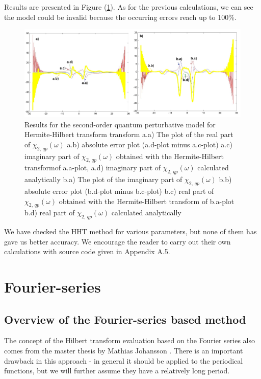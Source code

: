 \documentclass[12pt,twoside,a4paper]{article}
\numberwithin{equation}{subsection}
\numberwithin{figure}{subsection}
\begin{document}
Results are presented in Figure (\ref{fig:hht_qp2}). As for the previous calculations, we can see the model could be invalid
because the occurring errors reach up to 100\%.

\begin{figure} 
  \includegraphics[width=150mm]{img/hht_qp2.png}
  \caption{Results for the second-order quantum perturbative model for Hermite-Hilbert transform transform
     a.a) The plot of the real part of ${\chi_{2, \,qp}}(\omega )$
     a.b) absolute error plot (a.d-plot minus a.c-plot)
     a.c) imaginary part of ${\chi_{2, \,qp}}(\omega )$ obtained with the Hermite-Hilbert transformof a.a-plot, 
     a.d) imaginary part of ${\chi_{2, \,qp}}(\omega )$ calculated analytically 
     b.a) The plot of the imaginary part of ${\chi_{2, \,qp}}(\omega )$ 
     b.b) absolute error plot (b.d-plot minus b.c-plot)
     b.c) real part of ${\chi_{2, \,qp}}(\omega )$ obtained with the Hermite-Hilbert transform of b.a-plot 
     b.d) real part of $\chi_{2, \,qp} (\omega )$ calculated analytically 
     \label{fig:hht_qp2}
     }
\end{figure} 

We have checked the HHT method for various parameters, but none of them has gave us better accuracy. We
encourage the reader to carry out their own calculations with source code given in Appendix A.5.

\section{Fourier-series} \label{chap:fourier}

\subsection{Overview of the Fourier-series based method}  \label{chap:fourier_overview}

The concept of the Hilbert transform evaluation based on the Fourier series also comes from the master thesis by Mathias Johansson
\cite{johansson_hilbert}. There is an important drawback in this approach - in general it should be applied to the periodical
functions, but we will further assume they have a relatively long period. 
\end{document}
